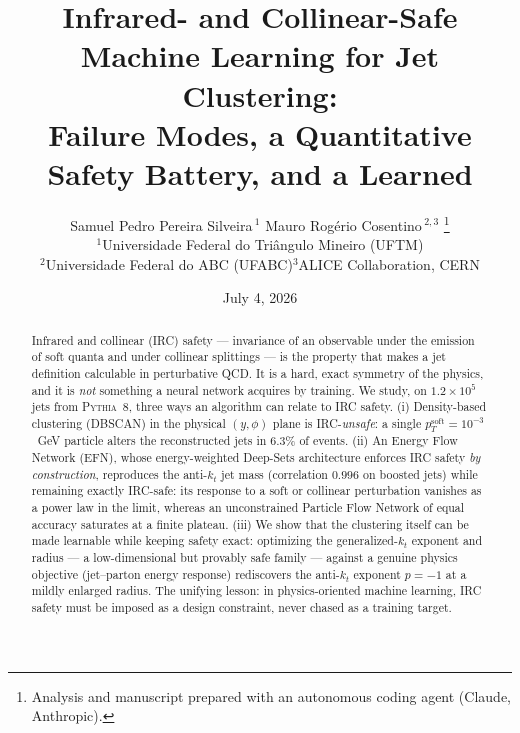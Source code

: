 \documentclass[11pt]{article}
\title{\vspace{-1.2cm}\bfseries Infrared- and Collinear-Safe Machine Learning for Jet
Clustering:\\ Failure Modes, a Quantitative Safety Battery, and a Learned \antikt}
\author{
  Samuel Pedro Pereira Silveira\,$^{1}$ \qquad Mauro Rog\'erio Cosentino\,$^{2,3}$%
  \thanks{Analysis and manuscript prepared with an autonomous coding agent (Claude, Anthropic).}\\[5pt]
  {\small $^{1}$Universidade Federal do Tri\^angulo Mineiro (UFTM)}\\[1pt]
  {\small $^{2}$Universidade Federal do ABC (UFABC)\qquad $^{3}$ALICE Collaboration, CERN}
}
\date{July 4, 2026}
\newcommand{\kt}{k_{t}}
\newcommand{\antikt}{anti-$\kt$}
\newcommand{\ptsoft}{p_{T}^{\mathrm{soft}}}
\begin{document}
\maketitle

\begin{abstract}
\noindent
Infrared and collinear (IRC) safety --- invariance of an observable under the emission
of soft quanta and under collinear splittings --- is the property that makes a jet
definition calculable in perturbative QCD. It is a hard, exact symmetry of the physics,
and it is \emph{not} something a neural network acquires by training. We study, on
$1.2\times10^{5}$ jets from \textsc{Pythia}~8, three ways an algorithm can relate to IRC
safety. (i) Density-based clustering (DBSCAN) in the physical $(y,\phi)$ plane is
IRC-\emph{unsafe}: a single $\ptsoft=10^{-3}$~GeV particle alters the reconstructed jets
in $6.3\%$ of events. (ii) An Energy Flow Network (EFN), whose energy-weighted Deep-Sets
architecture enforces IRC safety \emph{by construction}, reproduces the \antikt{} jet mass
(correlation $0.996$ on boosted jets) while remaining exactly IRC-safe: its response to a
soft or collinear perturbation vanishes as a power law in the limit, whereas an
unconstrained Particle Flow Network of equal accuracy saturates at a finite plateau.
(iii) We show that the clustering itself can be made learnable while keeping safety exact:
optimizing the generalized-$\kt$ exponent and radius --- a low-dimensional but provably safe
family --- against a genuine physics objective (jet--parton energy response) rediscovers the
\antikt{} exponent $p=-1$ at a mildly enlarged radius. The unifying
lesson: in physics-oriented machine learning, IRC safety must be imposed as a design
constraint, never chased as a training target.
\end{abstract}

\end{document}
